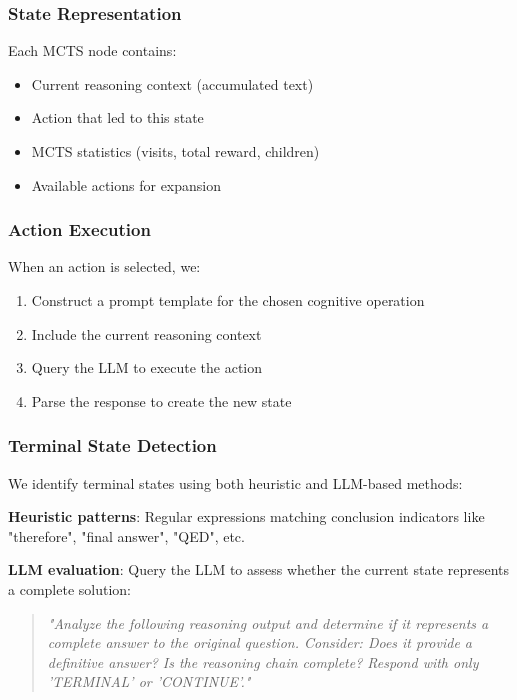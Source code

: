 \documentclass[conference]{IEEEtran}
\begin{document}
\subsubsection{State Representation}

Each MCTS node contains:
\begin{itemize}
\item Current reasoning context (accumulated text)
\item Action that led to this state
\item MCTS statistics (visits, total reward, children)
\item Available actions for expansion
\end{itemize}

\subsubsection{Action Execution}

When an action is selected, we:
\begin{enumerate}
\item Construct a prompt template for the chosen cognitive operation
\item Include the current reasoning context
\item Query the LLM to execute the action
\item Parse the response to create the new state
\end{enumerate}

\subsubsection{Terminal State Detection}

We identify terminal states using both heuristic and LLM-based methods:

\textbf{Heuristic patterns}: Regular expressions matching conclusion indicators like "therefore", "final answer", "QED", etc.

\textbf{LLM evaluation}: Query the LLM to assess whether the current state represents a complete solution:

\begin{quote}
\textit{"Analyze the following reasoning output and determine if it represents a complete answer to the original question. Consider: Does it provide a definitive answer? Is the reasoning chain complete? Respond with only 'TERMINAL' or 'CONTINUE'."}
\end{quote}
\end{document}
